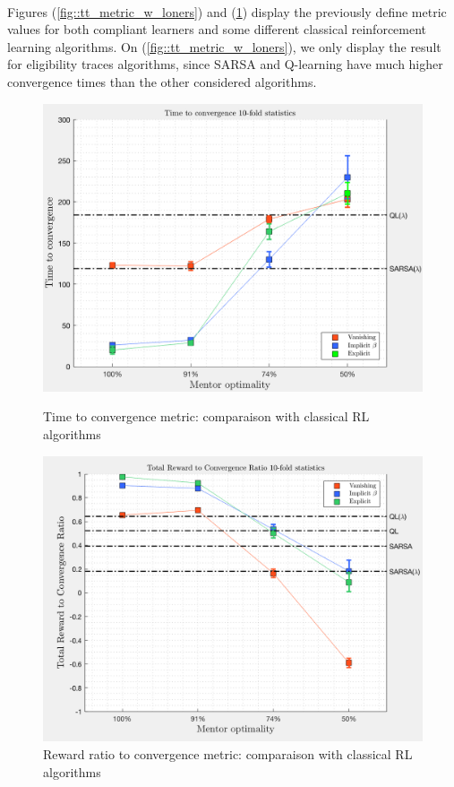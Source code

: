 \documentclass[a4paper]{report}
\begin{document}
{{{				\paragraph{} Figures (\ref{fig::tt_metric_w_loners}) and (\ref{fig::tr_metric_w_loners}) display the previously define metric values for both compliant learners and some different classical reinforcement learning algorithms. On (\ref{fig::tt_metric_w_loners}), we only display the result for eligibility traces algorithms, since SARSA and Q-learning have much higher convergence times than the other considered algorithms. 
				
				\begin{figure}
					\begin{minipage}{0.5\linewidth}
						\includegraphics[width=\linewidth]{tt_metric_w_loners}
						\caption{Time to convergence metric: comparaison with classical RL algorithms}
						\label{fig::tt_metric_w_loners}
					\end{minipage}
					\begin{minipage}{0.5\linewidth}
						\includegraphics[width=\linewidth]{tr_metric_w_loners}
						\caption{Reward ratio to convergence metric: comparaison with classical RL algorithms}
						\label{fig::tr_metric_w_loners}
					\end{minipage}
				\end{figure}
				
}}}
\end{document}
